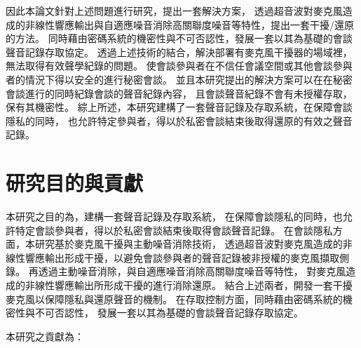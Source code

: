     因此本論文針對上述問題進行研究，提出一套解決方案，
透過超音波對麥克風造成的非線性響應輸出與自適應噪音消除高關聯度噪音等特性，提出一套干擾/還原的方法。
同時藉由密碼系統的機密性與不可否認性，發展一套以其為基礎的會談聲音記錄存取協定。
透過上述技術的結合，解決部署有麥克風干擾器的場域裡，無法取得有效聲學紀錄的問題。
使會談參與者在不信任會議空間或其他會談參與者的情況下得以安全的進行秘密會談。
並且本研究提出的解決方案可以在在秘密會談進行的同時紀錄會談的聲音紀錄內容，
且會談聲音紀錄不會有未授權存取，保有其機密性。
綜上所述，本研究建構了一套聲音記錄及存取系統，在保障會談隱私的同時，
也允許特定參與者，得以於私密會談結束後取得還原的有效之聲音記錄。


\section{研究目的與貢獻}\label{section:intro-purpose}

    本研究之目的為，建構一套聲音記錄及存取系統，
在保障會談隱私的同時，也允許特定會談參與者，得以於私密會談結束後取得會談聲音記錄。
在會談隱私方面，本研究基於麥克風干擾與主動噪音消除技術，
透過超音波對麥克風造成的非線性響應輸出形成干擾，以避免會談參與者的聲音記錄被非授權的麥克風擷取側錄。
再透過主動噪音消除，與自適應噪音消除高關聯度噪音等特性，
對麥克風造成的非線性響應輸出所形成干擾的進行消除還原。
結合上述兩者，開發一套干擾麥克風以保障隱私與還原聲音的機制。
在存取控制方面，同時藉由密碼系統的機密性與不可否認性，
發展一套以其為基礎的會談聲音記錄存取協定。

    本研究之貢獻為：

